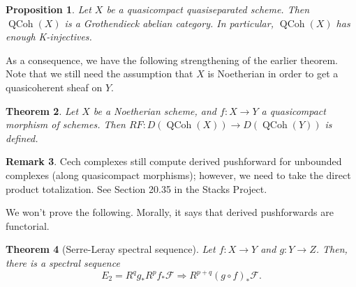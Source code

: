 \documentclass[10pt]{article}
\newtheorem{thm}{Theorem}[section]
\newtheorem{prop}[thm]{Proposition}
\theoremstyle{definition}
\newtheorem{rmk}[thm]{Remark}
\DeclareMathOperator{\QCoh}{QCoh}
\newcommand{\OO}{\mathcal{O}}
\begin{document}
\begin{prop}
Let $X$ be a quasicompact quasiseparated scheme.  Then $\QCoh(X)$ is a Grothendieck abelian category.  In particular, $\QCoh(X)$ has enough K-injectives.
\end{prop}

As a consequence, we have the following strengthening of the earlier theorem.  Note that we still need the assumption that $X$ is Noetherian in order to get a quasicoherent sheaf on $Y$.
\begin{thm}
Let $X$ be a Noetherian scheme, and $f: X \rightarrow Y$ a quasicompact morphism of schemes.  Then $RF: D(\QCoh(X)) \rightarrow D(\QCoh(Y))$ is defined.  
\end{thm}


\begin{rmk}
Cech complexes still compute derived pushforward for unbounded complexes (along quasicompact morphisms); however, we need to take the direct product totalization.  See Section 20.35 in the Stacks Project.
\end{rmk}




We won't prove the following.  Morally, it says that derived pushforwards are functorial.
\begin{thm}[Serre-Leray spectral sequence]
Let $f: X \rightarrow Y$ and $g: Y \rightarrow Z$.  Then, there is a spectral sequence
$$E_2 = R^qg_* R^p f_* \mathcal{F} \Rightarrow R^{p+q}(g \circ f)_* \mathcal{F}.$$
\end{thm}
\end{document}
